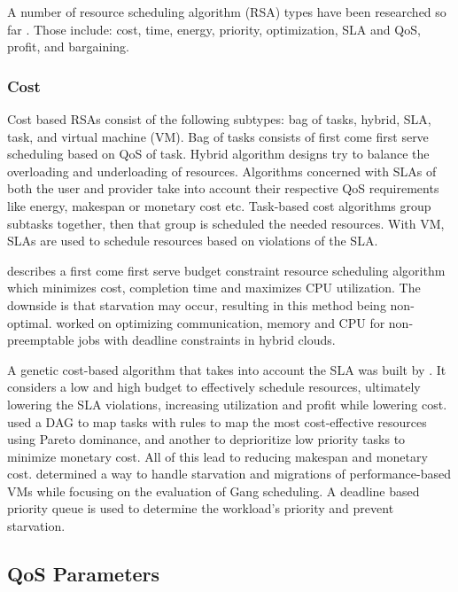 \documentclass[12pt]{article}
\begin{document}
A number of resource scheduling algorithm (RSA) types have been researched so far \cite{Singh2016}. Those include: cost, time, energy, priority, optimization, SLA and QoS, profit, and bargaining.


\subsubsection{Cost} \label{ssub:algCost}

Cost based RSAs consist of the following subtypes: bag of tasks, hybrid, SLA, task, and virtual machine (VM). Bag of tasks consists of first come first serve scheduling based on QoS of task. Hybrid algorithm designs try to balance the overloading and underloading of resources. Algorithms concerned with SLAs of both the user and provider take into account their respective QoS requirements like energy, makespan or monetary cost etc. Task-based cost algorithms group subtasks together, then that group is scheduled the needed resources. With VM, SLAs are used to schedule resources based on violations of the SLA.

\textcite{ana2010} describes a first come first serve budget constraint resource scheduling algorithm which minimizes cost, completion time and maximizes CPU utilization. The downside is that starvation may occur, resulting in this  method being non-optimal.
\textcite{van2010cost} worked on optimizing communication, memory and CPU for non-preemptable jobs with deadline constraints in hybrid clouds.

A genetic cost-based algorithm that takes into account the SLA was built by \textcite{liu2013cost}. It considers a low and high budget to effectively schedule resources, ultimately lowering the SLA violations, increasing utilization and profit while lowering cost.
\textcite{su2013cost} used a DAG to map tasks with rules to map the most cost-effective resources using Pareto dominance, and another to deprioritize low priority tasks to minimize monetary cost. All of this lead to reducing makespan and monetary cost.
\textcite{ioannis2011cost} determined a way to handle starvation and migrations of performance-based VMs while focusing on the evaluation of Gang scheduling. A deadline based priority queue is used to determine the workload's priority and prevent starvation.



\subsection{QoS Parameters} \label{sub:schedQosParams}
\end{document}
